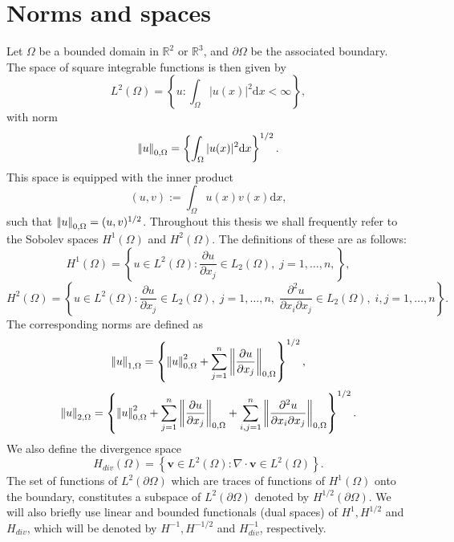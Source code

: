 \section{Norms and spaces}
Let $\Omega$ be a bounded domain in $\mathbb{R}^{2}$ or $\mathbb{R}^{3}$, and $\partial\Omega$ be the associated boundary. The space of square integrable functions is then given by
\begin{equation*}
L^{2}(\Omega)  = \left\lbrace  u : \int_{\Omega} |u(x)|^{2} \mbox{d}x < \infty \right\rbrace,
\end{equation*}
with norm
\begin{equation*}
{\left\vert\kern-0.25ex\left\vert u \right\vert\kern-0.25ex\right\vert}_{0,\Omega}  = \left\lbrace \int_{\Omega} |u(x)|^{2} \mbox{d}x  \right\rbrace^{1/2}.
\end{equation*}
This space is equipped with the inner product
\begin{equation*}
(u,v)  :=  \int_{\Omega} u(x)v(x) \mbox{d}x,
\end{equation*}
such that ${\left\vert\kern-0.25ex\left\vert u \right\vert\kern-0.25ex\right\vert}_{0,\Omega}=(u,v)^{1/2}$. Throughout this thesis we shall frequently refer to the Sobolev spaces
$H^{1}(\Omega)$ and $H^{2}(\Omega)$. The definitions of these are as follows:
%
\begin{equation*}
H^{1}(\Omega)  = \left\lbrace  u  \in L^{2}(\Omega): \frac{\partial u }{\partial x_{j}} \in L_{2}(\Omega) , \; j=1,\ldots ,n, \right\rbrace,
\end{equation*}
\begin{equation*}
H^{2}(\Omega)  = \left\lbrace  u  \in L^{2}(\Omega): \frac{\partial u }{\partial x_{j}} \in L_{2}(\Omega) , \; j=1,\ldots ,n, \;  \frac{\partial^{2} u }{\partial x_{i} \partial x_{j}} \in L_{2}(\Omega), \; i,j=1,\ldots ,n \right\rbrace.
\end{equation*}
The corresponding norms are defined as
\begin{equation*}
{\left\vert\kern-0.25ex\left\vert u \right\vert\kern-0.25ex\right\vert}_{1,\Omega}  = \left\lbrace {\left\vert\kern-0.25ex\left\vert u \right\vert\kern-0.25ex\right\vert}_{0,\Omega}^{2} + \sum_{j=1}^{n} {\left\vert\kern-0.25ex\left\vert \frac{\partial u }{\partial x_{j}} \right\vert\kern-0.25ex\right\vert}_{0,\Omega}   \right\rbrace^{1/2},
\end{equation*}
\begin{equation*}
{\left\vert\kern-0.25ex\left\vert u \right\vert\kern-0.25ex\right\vert}_{2,\Omega}  = \left\lbrace {\left\vert\kern-0.25ex\left\vert u \right\vert\kern-0.25ex\right\vert}_{0,\Omega}^{2} + \sum_{j=1}^{n} {\left\vert\kern-0.25ex\left\vert \frac{\partial u }{\partial x_{j}} \right\vert\kern-0.25ex\right\vert}_{0,\Omega}  + \sum_{i,j=1}^{n} {\left\vert\kern-0.25ex\left\vert \frac{\partial^{2} u }{\partial x_{i} \partial x_{j}} \right\vert\kern-0.25ex\right\vert}_{0,\Omega}  \right\rbrace^{1/2}.
\end{equation*}
We also define the divergence space 
\begin{equation*}
H_{div}(\Omega)=\left\lbrace \boldsymbol{v}\in L^{2}(\Omega): \nabla \cdot \boldsymbol{v} \in L^{2}(\Omega) \right\rbrace.
\end{equation*}
The set of functions of $L^{2}(\partial \Omega)$ which are traces of functions of $H^{1}(\Omega)$ onto the boundary, constitutes a subspace of $L^{2}(\partial \Omega)$ denoted by $H^{1/2}(\partial \Omega)$. We will also briefly use linear and bounded functionals (dual spaces) of $H^{1},H^{1/2}$ and $H_{div}$, which will be denoted by $H^{-1},H^{-1/2}$ and $H_{div}^{-1}$, respectively. 

